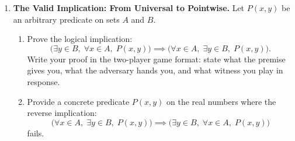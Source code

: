 \begin{enumerate}
  \item \textbf{The Valid Implication: From Universal to Pointwise.}
  Let $P(x, y)$ be an arbitrary predicate on sets $A$ and $B$.
  \begin{enumerate}
    \item Prove the logical implication:
    \[
    \bigl(\exists y \in B, \; \forall x \in A, \; P(x, y)\bigr) \implies \bigl(\forall x \in A, \; \exists y \in B, \; P(x, y)\bigr).
    \]
    Write your proof in the two-player game format: state what the premise gives you, what the adversary hands you, and what witness you play in response.
    \item Provide a concrete predicate $P(x, y)$ on the real numbers where the reverse implication:
    \[
    \bigl(\forall x \in A, \; \exists y \in B, \; P(x, y)\bigr) \implies \bigl(\exists y \in B, \; \forall x \in A, \; P(x, y)\bigr)
    \]
    fails.
  \end{enumerate}
\end{enumerate}

\newpage
